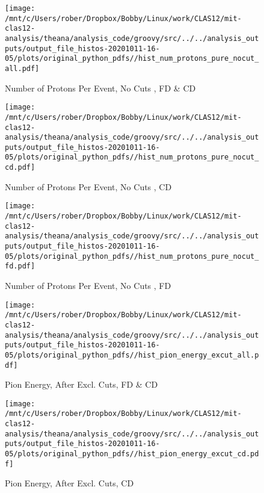 \documentclass{article}
\begin{document}
\begin{landscape}
    \begin{figure}[h]
        \centering

        \texttt{[image: /mnt/c/Users/rober/Dropbox/Bobby/Linux/work/CLAS12/mit-clas12-analysis/theana/analysis\_code/groovy/src/../../analysis\_outputs/output\_file\_histos-20201011-16-05/plots/original\_python\_pdfs//hist\_num\_protons\_pure\_nocut\_all.pdf]}
        \captionsetup{textformat=empty,labelformat=blank}
        \caption{Number of Protons Per Event, No Cuts , FD \& CD}
    \end{figure}
    \clearpage
    
    \begin{figure}[h]
        \centering

        \texttt{[image: /mnt/c/Users/rober/Dropbox/Bobby/Linux/work/CLAS12/mit-clas12-analysis/theana/analysis\_code/groovy/src/../../analysis\_outputs/output\_file\_histos-20201011-16-05/plots/original\_python\_pdfs//hist\_num\_protons\_pure\_nocut\_cd.pdf]}
        \captionsetup{textformat=empty,labelformat=blank}
        \caption{Number of Protons Per Event, No Cuts , CD}
    \end{figure}
    \clearpage
    
    \begin{figure}[h]
        \centering

        \texttt{[image: /mnt/c/Users/rober/Dropbox/Bobby/Linux/work/CLAS12/mit-clas12-analysis/theana/analysis\_code/groovy/src/../../analysis\_outputs/output\_file\_histos-20201011-16-05/plots/original\_python\_pdfs//hist\_num\_protons\_pure\_nocut\_fd.pdf]}
        \captionsetup{textformat=empty,labelformat=blank}
        \caption{Number of Protons Per Event, No Cuts , FD}
    \end{figure}
    \clearpage
    
    \begin{figure}[h]
        \centering

        \texttt{[image: /mnt/c/Users/rober/Dropbox/Bobby/Linux/work/CLAS12/mit-clas12-analysis/theana/analysis\_code/groovy/src/../../analysis\_outputs/output\_file\_histos-20201011-16-05/plots/original\_python\_pdfs//hist\_pion\_energy\_excut\_all.pdf]}
        \captionsetup{textformat=empty,labelformat=blank}
        \caption{Pion Energy, After Excl. Cuts, FD \& CD}
    \end{figure}
    \clearpage
    
    \begin{figure}[h]
        \centering

        \texttt{[image: /mnt/c/Users/rober/Dropbox/Bobby/Linux/work/CLAS12/mit-clas12-analysis/theana/analysis\_code/groovy/src/../../analysis\_outputs/output\_file\_histos-20201011-16-05/plots/original\_python\_pdfs//hist\_pion\_energy\_excut\_cd.pdf]}
        \captionsetup{textformat=empty,labelformat=blank}
        \caption{Pion Energy, After Excl. Cuts, CD}
    \end{figure}
    \clearpage
    

\end{landscape}
\end{document}
